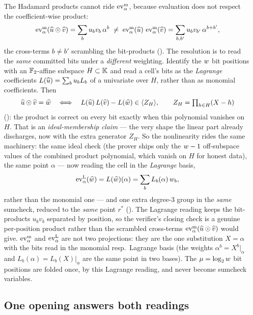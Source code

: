 The Hadamard products cannot ride $\operatorname{ev}^{\mathrm{m}}_{\alpha}$, because evaluation does not
respect the coefficient-wise product:
\[
  \operatorname{ev}^{\mathrm{m}}_{\alpha}(\widehat{u}\odot\widehat{v}) = \sum_b u_b v_b\,\alpha^{b}
  \;\neq\;
  \operatorname{ev}^{\mathrm{m}}_{\alpha}(\widehat{u})\,\operatorname{ev}^{\mathrm{m}}_{\alpha}(\widehat{v}) = \sum_{b,b'} u_b v_{b'}\,\alpha^{b+b'},
\]
the cross-terms $b\neq b'$ scrambling the bit-products
(). The resolution is to read the \emph{same}
committed bits under a \emph{different} weighting. Identify the $w$ bit
positions with an $\mathbb{F}_2$-affine subspace $H\subset\mathbb{K}$ and read a cell's
bits as the \emph{Lagrange} coefficients $L(\widehat{u})=\sum_b u_b L_b$ of a
univariate over $H$, rather than as monomial coefficients. Then
\[
  \widehat{u}\odot\widehat{v}=\widehat{w}
  \quad\Longleftrightarrow\quad
  L(\widehat{u})\,L(\widehat{v})-L(\widehat{w}) \in \langle Z_H \rangle,
  \qquad Z_H=\textstyle\prod_{h\in H}(X-h)
\]
(): the product is correct on every bit exactly when
this polynomial vanishes on $H$. That is an \emph{ideal-membership claim}
--- the very shape the linear part already discharges, now with the extra
generator $Z_H$. So the nonlinearity rides the same machinery: the same
ideal check (the prover ships only the $w-1$ off-subspace values of the
combined product polynomial, which vanish on $H$ for honest data), the same
point $\alpha$ --- now reading the cell in the \emph{Lagrange} basis,
\[
  \operatorname{ev}^{\mathrm{L}}_{\alpha}(\widehat{w}) = L(\widehat{w})(\alpha) = \sum_b L_b(\alpha)\,w_b,
\]
rather than the monomial one --- and one extra degree-$3$ group in the
\emph{same} sumcheck, reduced to the \emph{same} point $r^*$
(). The Lagrange reading keeps the bit-products $u_bv_b$
separated by position, so the verifier's closing check is a genuine
per-position product rather than the scrambled cross-terms
$\operatorname{ev}^{\mathrm{m}}_{\alpha}(\widehat{u}\odot\widehat{v})$ would give. $\operatorname{ev}^{\mathrm{m}}_{\alpha}$ and $\operatorname{ev}^{\mathrm{L}}_{\alpha}$ are not two
projections: they are the one substitution $X=\alpha$ with the bits read in
the monomial resp.\ Lagrange basis (the weights $\alpha^b=X^b|_\alpha$ and
$L_b(\alpha)=L_b(X)|_\alpha$ are the same point in two bases). The
$\mu=\log_2w$ bit positions are folded once, by this Lagrange reading,
and never become sumcheck variables.

\subsection{One opening answers both readings}
\label{sec:overview-open}

